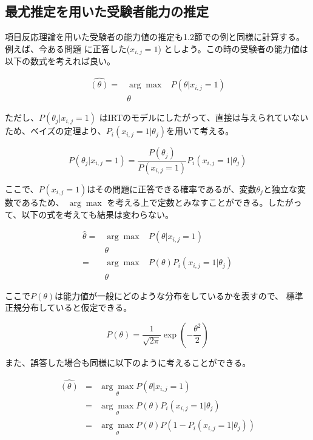 \documentclass{jsarticle}
\begin{document}
\subsection{最尤推定を用いた受験者能力の推定}
項目反応理論を用いた受験者の能力値の推定も1.2節での例と同様に計算する。例えば、今ある問題
に正答した($x_{i, j} = 1$) としよう。この時の受験者の能力値は以下の数式を考えれば良い。

\begin{eqnarray*}
  \hat{(\theta)} = &\arg \max& P(\theta | x_{i, j} = 1) \\
                 & \theta &
\end{eqnarray*}

ただし、$P({\theta}_j | x_{i, j} = 1)$ はIRTのモデルにしたがって、直接は与えられていない
ため、ベイズの定理より、$P_i(x_{i, j} = 1 | {\theta}_j)$を用いて考える。

$$
  P({\theta}_j | x_{i, j} = 1) = \frac{P({\theta}_j)}{P(x_{i,j} = 1)} P_i(x_{i,j} = 1 | {\theta}_j)
$$

ここで、$P(x_{i,j} = 1)$はその問題に正答できる確率であるが、変数${\theta}_j$と独立な変数であるため、
$\arg \max$ を考える上で定数とみなすことができる。したがって、以下の式を考えても結果は変わらない。
 

 \begin{eqnarray*}
   \hat{\theta} = &\arg \max& P(\theta | x_{i, j} = 1) \\
                  &\theta& \\
                = &\arg \max& P(\theta)P_i(x_{i,j} = 1 | {\theta}_j) \\
                  &\theta&
 \end{eqnarray*}

 ここで$P(\theta)$は能力値が一般にどのような分布をしているかを表すので、
 標準正規分布していると仮定できる。

$$
  P(\theta) = \frac{1}{\sqrt{2 \pi}} \exp(- \frac{{\theta}^2}{2})
$$

また、誤答した場合も同様に以下のように考えることができる。

\begin{eqnarray*}
  \hat{(\theta)} &=& \underset{\theta}{\arg \max} P( \theta | x_{i,j} = 1) \\
                 &=& \underset{\theta}{\arg \max} P( \theta ) P_i(x_{i,j} = 1 | {\theta}_j) \\
                 &=& \underset{\theta}{\arg \max} P( \theta ) P(1 - P_i(x_{i,j} = 1 | {\theta}_j))
\end{eqnarray*}
\end{document}
